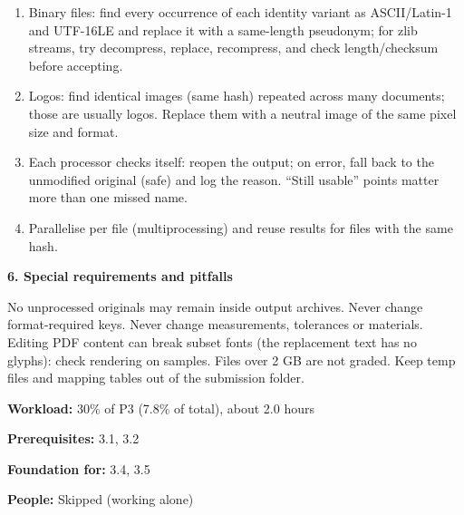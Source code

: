 \documentclass[a4paper,12pt]{article}
\newcommand{\partbox}[3]{%
\begin{mdframed}[nobreak=true,linecolor=#1,linewidth=1.2pt,topline=false,rightline=false,bottomline=false,leftmargin=0pt,rightmargin=0pt,innerleftmargin=10pt,backgroundcolor=#1!6]
\textbf{\color{#1}#2}\par\smallskip #3
\end{mdframed}}
\newcommand{\metabox}[5]{%
\begin{mdframed}[nobreak=true,linecolor=#1,linewidth=1pt,leftmargin=0pt,rightmargin=0pt,backgroundcolor=#1!15]
\textbf{Workload:} #2\par
\textbf{Prerequisites:} #3\par
\textbf{Foundation for:} #4\par
\textbf{People:} #5
\end{mdframed}}
\begin{document}
{\begin{enumerate}[leftmargin=1.4em]
  \item Binary files: find every occurrence of each identity variant as ASCII/Latin-1 and UTF-16LE and replace it with a same-length pseudonym; for zlib streams, try decompress, replace, recompress, and check length/checksum before accepting.
  \item Logos: find identical images (same hash) repeated across many documents; those are usually logos. Replace them with a neutral image of the same pixel size and format.
  \item Each processor checks itself: reopen the output; on error, fall back to the unmodified original (safe) and log the reason. ``Still usable'' points matter more than one missed name.
  \item Parallelise per file (multiprocessing) and reuse results for files with the same hash.
\end{enumerate}}
\partbox{p3}{6. Special requirements and pitfalls}{No unprocessed originals may remain inside output archives. Never change format-required keys. Never change measurements, tolerances or materials. Editing PDF content can break subset fonts (the replacement text has no glyphs): check rendering on samples. Files over 2 GB are not graded. Keep temp files and mapping tables out of the submission folder.}
\metabox{p3}{30\% of P3 (7.8\% of total), about 2.0 hours}{3.1, 3.2}{3.4, 3.5}{Skipped (working alone)}

\end{document}
